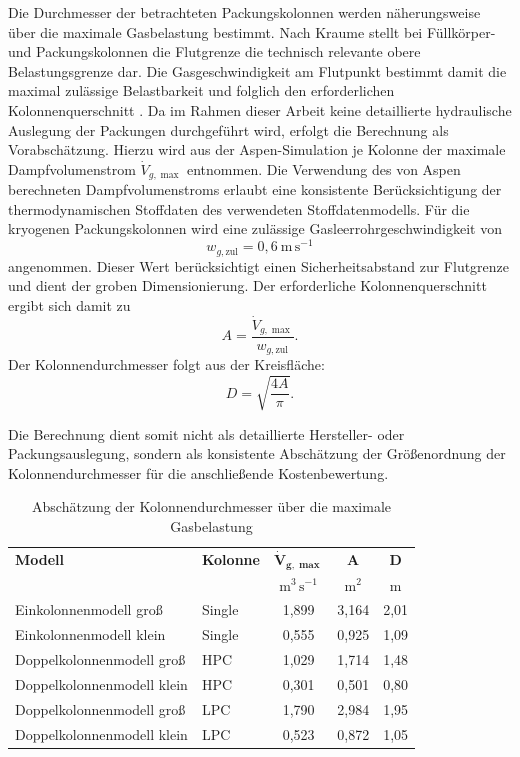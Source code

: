 Die Durchmesser der betrachteten Packungskolonnen werden näherungsweise über die maximale Gasbelastung bestimmt. Nach Kraume stellt bei Füllkörper- und Packungskolonnen die Flutgrenze die technisch relevante obere Belastungsgrenze dar. Die Gasgeschwindigkeit am Flutpunkt bestimmt damit die maximal zulässige Belastbarkeit und folglich den erforderlichen Kolonnenquerschnitt \cite{kraumeTransportvorgaengeVerfahrenstechnikGrundlagen2020}.
Da im Rahmen dieser Arbeit keine detaillierte hydraulische Auslegung der
Packungen durchgeführt wird, erfolgt die Berechnung als Vorabschätzung. Hierzu
wird aus der Aspen-Simulation je Kolonne der maximale Dampfvolumenstrom
\(\dot V_{g,\max}\) entnommen. Die Verwendung des von Aspen berechneten
Dampfvolumenstroms erlaubt eine konsistente Berücksichtigung der
thermodynamischen Stoffdaten des verwendeten Stoffdatenmodells.
Für die kryogenen Packungskolonnen wird eine zulässige Gasleerrohrgeschwindigkeit von
\begin{equation}
    w_{g,\mathrm{zul}} = 0{,}6 \ \mathrm{m\,s^{-1}}
\end{equation}
angenommen. Dieser Wert berücksichtigt einen Sicherheitsabstand zur Flutgrenze und dient der groben Dimensionierung. Der erforderliche Kolonnenquerschnitt ergibt sich damit zu
\begin{equation}
    A = \frac{\dot V_{g,\max}}{w_{g,\mathrm{zul}}}.
\end{equation}
Der Kolonnendurchmesser folgt aus der Kreisfläche:
\begin{equation}
    D = \sqrt{\frac{4A}{\pi}}.
\end{equation}

Die Berechnung dient somit nicht als detaillierte Hersteller- oder
Packungsauslegung, sondern als konsistente Abschätzung der Größenordnung der Kolonnendurchmesser für die anschließende Kostenbewertung.

\begin{table}[H]
\centering
\caption{Abschätzung der Kolonnendurchmesser über die maximale Gasbelastung}
\label{tab:kolonnendurchmesser_packung}
\small
\begin{tabular}{llccc}
\toprule
\textbf{Modell} &
\textbf{Kolonne} &
\(\boldsymbol{\dot V_{g,\max}}\) &
\(\boldsymbol{A}\) &
\(\boldsymbol{D}\) \\
&
&
\(\mathrm{m^3\,s^{-1}}\) &
\(\mathrm{m^2}\) &
\(\mathrm{m}\) \\
\midrule
Einkolonnenmodell groß      & Single & 1{,}899 & 3{,}164 & 2{,}01 \\
Einkolonnenmodell klein     & Single & 0{,}555 & 0{,}925 & 1{,}09 \\
Doppelkolonnenmodell groß   & HPC    & 1{,}029 & 1{,}714 & 1{,}48 \\
Doppelkolonnenmodell klein  & HPC    & 0{,}301 & 0{,}501 & 0{,}80 \\
Doppelkolonnenmodell groß   & LPC    & 1{,}790 & 2{,}984 & 1{,}95 \\
Doppelkolonnenmodell klein  & LPC    & 0{,}523 & 0{,}872 & 1{,}05 \\
\bottomrule
\end{tabular}
\end{table}

